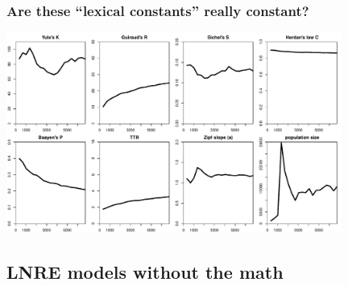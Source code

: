 \documentclass[t]{beamer} %
\begin{document}
\begin{frame}[c]
  \frametitle{Are these ``lexical constants'' really constant?}

  \centering
  \includegraphics[width=11cm]{img/bare_bncS_obs_lexical_constants}
\end{frame}


\subsection{LNRE models without the math}
\end{document}
